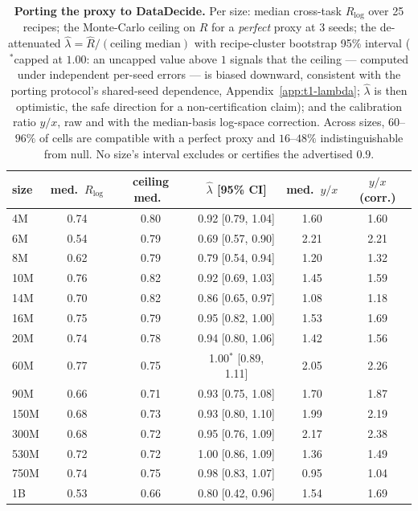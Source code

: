 \begin{table}[!htbp]
\centering
\caption{\textbf{Porting the proxy to DataDecide.} Per size: median cross-task
$R_{\log}$ over 25 recipes; the Monte-Carlo ceiling on $R$ for a \emph{perfect} proxy at 3
seeds; the de-attenuated $\hat\lambda = \hat R/(\text{ceiling median})$ with recipe-cluster
bootstrap 95\% interval ($^*$capped at $1.00$: an uncapped value above $1$ signals that the
ceiling --- computed under independent per-seed errors --- is biased downward,
consistent with the porting protocol's shared-seed
dependence, Appendix~\ref{app:t1-lambda}; $\hat\lambda$ is then optimistic, the safe
direction for a non-certification claim); and the calibration ratio $y/x$, raw and with the
median-basis log-space correction.
 Across sizes, $60$--$96\%$ of cells are compatible with a
perfect proxy and $16$--$48\%$ indistinguishable from null. No size's interval excludes or
certifies the advertised $0.9$.}
\label{tab:t1b}
\footnotesize
\setlength{\tabcolsep}{3.5pt}
\begin{tabular}{@{}lccccc@{}}
\toprule
size & med.\ $R_{\log}$ & ceiling med.\ & $\hat\lambda$ [95\% CI] & med.\ $y/x$ & $y/x$ (corr.) \\
\midrule
4M & 0.74 & 0.80 & 0.92 [0.79, 1.04] & 1.60 & 1.60 \\
6M & 0.54 & 0.79 & 0.69 [0.57, 0.90] & 2.21 & 2.21 \\
8M & 0.62 & 0.79 & 0.79 [0.54, 0.94] & 1.20 & 1.32 \\
10M & 0.76 & 0.82 & 0.92 [0.69, 1.03] & 1.45 & 1.59 \\
14M & 0.70 & 0.82 & 0.86 [0.65, 0.97] & 1.08 & 1.18 \\
16M & 0.75 & 0.79 & 0.95 [0.82, 1.00] & 1.53 & 1.69 \\
20M & 0.74 & 0.78 & 0.94 [0.80, 1.06] & 1.42 & 1.56 \\
60M & 0.77 & 0.75 & 1.00$^*$ [0.89, 1.11] & 2.05 & 2.26 \\
90M & 0.66 & 0.71 & 0.93 [0.75, 1.08] & 1.70 & 1.87 \\
150M & 0.68 & 0.73 & 0.93 [0.80, 1.10] & 1.99 & 2.19 \\
300M & 0.68 & 0.72 & 0.95 [0.76, 1.09] & 2.17 & 2.38 \\
530M & 0.72 & 0.72 & 1.00 [0.86, 1.09] & 1.36 & 1.49 \\
750M & 0.74 & 0.75 & 0.98 [0.83, 1.07] & 0.95 & 1.04 \\
1B & 0.53 & 0.66 & 0.80 [0.42, 0.96] & 1.54 & 1.69 \\
\bottomrule
\end{tabular}
\end{table}

